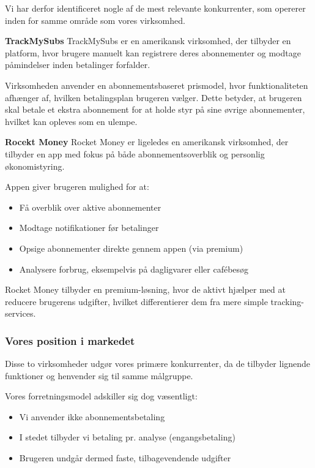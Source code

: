 Vi har derfor identificeret nogle af de mest relevante konkurrenter, som opererer inden for samme område som vores virksomhed. 

\vspace{2cm}
\textbf{TrackMySubs}
TrackMySubs er en amerikansk virksomhed, der tilbyder en platform, hvor brugere manuelt kan registrere deres abonnementer og modtage påmindelser inden betalinger forfalder. 

Virksomheden anvender en abonnementsbaseret prismodel, hvor funktionaliteten afhænger af, hvilken betalingsplan brugeren vælger. Dette betyder, at brugeren skal betale et ekstra abonnement for at holde styr på sine øvrige abonnementer, hvilket kan opleves som en ulempe. 

\vspace{1cm}
\textbf{Rocekt Money}
Rocket Money er ligeledes en amerikansk virksomhed, der tilbyder en app med fokus på både abonnementsoverblik og personlig økonomistyring. 

Appen giver brugeren mulighed for at: 
\begin{itemize}
\item Få overblik over aktive abonnementer  
\item Modtage notifikationer før betalinger  
\item Opsige abonnementer direkte gennem appen (via premium)  
\item Analysere forbrug, eksempelvis på dagligvarer eller cafébesøg  
\end{itemize}

Rocket Money tilbyder en premium-løsning, hvor de aktivt hjælper med at reducere brugerens udgifter, hvilket differentierer dem fra mere simple tracking-services. 

\subsubsection{Vores position i markedet}
Disse to virksomheder udgør vores primære konkurrenter, da de tilbyder lignende funktioner og henvender sig til samme målgruppe. 

Vores forretningsmodel adskiller sig dog væsentligt: 
\begin{itemize}
\item Vi anvender ikke abonnementsbetaling  
\item I stedet tilbyder vi betaling pr. analyse (engangsbetaling)  
\item Brugeren undgår dermed faste, tilbagevendende udgifter  
\end{itemize}

